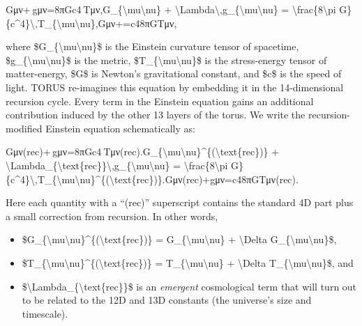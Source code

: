 \documentclass[
]{article}
\begin{document}
Gμν+\Lambda gμν=8πGc4 Tμν,G\_\{\textbackslash mu\textbackslash nu\} +
\textbackslash Lambda\textbackslash,g\_\{\textbackslash mu\textbackslash nu\}
= \textbackslash frac\{8\textbackslash pi
G\}\{c\^{}4\}\textbackslash,T\_\{\textbackslash mu\textbackslash nu\},Gμν\hspace{0pt}+\hspace{0pt}=c48πG\hspace{0pt}Tμν\hspace{0pt},

where \$G\_\{\textbackslash mu\textbackslash nu\}\$ is the Einstein
curvature tensor of spacetime,
\$g\_\{\textbackslash mu\textbackslash nu\}\$ is the metric,
\$T\_\{\textbackslash mu\textbackslash nu\}\$ is the stress-energy
tensor of matter-energy, \$G\$ is Newton's gravitational constant, and
\$c\$ is the speed of light. TORUS re-imagines this equation by
embedding it in the 14-dimensional recursion cycle. Every term in the
Einstein equation gains an additional contribution induced by the other
13 layers of the torus. We write the recursion-modified Einstein
equation schematically as:

Gμν(rec)+\Lambdarec gμν=8πGc4 Tμν(rec).G\_\{\textbackslash mu\textbackslash nu\}\^{}\{(\textbackslash text\{rec\})\}
+
\textbackslash Lambda\_\{\textbackslash text\{rec\}\}\textbackslash,g\_\{\textbackslash mu\textbackslash nu\}
= \textbackslash frac\{8\textbackslash pi
G\}\{c\^{}4\}\textbackslash,T\_\{\textbackslash mu\textbackslash nu\}\^{}\{(\textbackslash text\{rec\})\}.Gμν(rec)\hspace{0pt}+\Lambdarec\hspace{0pt}gμν\hspace{0pt}=c48πG\hspace{0pt}Tμν(rec)\hspace{0pt}.

Here each quantity with a ``(rec)'' superscript contains the standard 4D
part plus a small correction from recursion. In other words,

\begin{itemize}
\item
  \$G\_\{\textbackslash mu\textbackslash nu\}\^{}\{(\textbackslash text\{rec\})\}
  = G\_\{\textbackslash mu\textbackslash nu\} + \textbackslash Delta
  G\_\{\textbackslash mu\textbackslash nu\}\$,
\item
  \$T\_\{\textbackslash mu\textbackslash nu\}\^{}\{(\textbackslash text\{rec\})\}
  = T\_\{\textbackslash mu\textbackslash nu\} + \textbackslash Delta
  T\_\{\textbackslash mu\textbackslash nu\}\$, and
\item
  \$\textbackslash Lambda\_\{\textbackslash text\{rec\}\}\$ is an
  \emph{emergent} cosmological term that will turn out to be related to
  the 12D and 13D constants (the universe's size and timescale).
\end{itemize}
\end{document}
